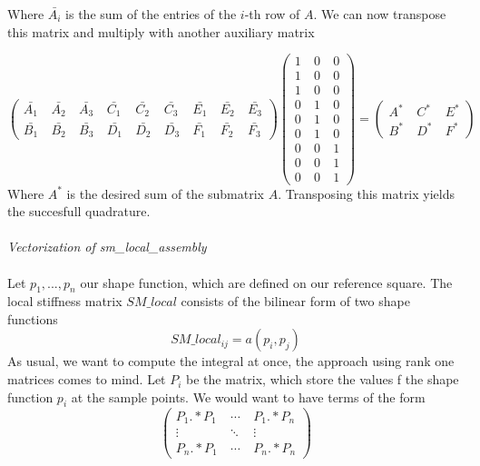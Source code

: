 Where $\bar{A_i}$ is the sum of the entries of the $i$-th row of $A$. We can now transpose this matrix and multiply with another auxiliary matrix

\[\begin{pmatrix} \bar{A_1} &\ \bar{A_2} &\ \bar{A_3} &\ \bar{C_1} &\ \bar{C_2} &\ \bar{C_3} &\ \bar{E_1} &\ \bar{E_2} &\ \bar{E_3} \\
\bar{B_1} &\ \bar{B_2} &\ \bar{B_3} &\ \bar{D_1} &\ \bar{D_2} &\ \bar{D_3} &\ \bar{F_1} &\ \bar{F_2} &\ \bar{F_3} \end{pmatrix}
\begin{pmatrix} 1 &\ 0 &\ 0 \\
				1 &\ 0 &\ 0 \\
                1 &\ 0 &\ 0 \\
                0 &\ 1 &\ 0 \\
                0 &\ 1 &\ 0 \\
                0 &\ 1 &\ 0 \\
                0 &\ 0 &\ 1 \\
                0 &\ 0 &\ 1 \\
                0 &\ 0 &\ 1 \end{pmatrix} = \begin{pmatrix} A^* &\ C^* &\ E^* \\ B^* &\ D^* &\ F^* \end{pmatrix} \]
Where $A^*$ is the desired sum of the submatrix $A$. Transposing this matrix yields the succesfull quadrature.\\
\\
\textit{Vectorization of sm\_local\_assembly}\\ \\
Let $p_1,...,p_n$ our shape function, which are defined on our reference square. The local stiffness matrix $SM\_local$ consists of the bilinear form of two shape functions
\[SM\_local_{i j}=a(p_i,p_j)\]
As usual, we want to compute the integral at once, the approach using rank one matrices comes to mind. Let $P_i$ be the matrix, which store the values f the shape function $p_i$ at the sample points. We would want to have terms of the form
\begin{equation} \begin{pmatrix} P_1.*P_1 &\ \cdots &\ P_1.*P_n \\
				   \vdots  &\ \ddots &\ \vdots \\
				   P_n.*P_1 &\ \cdots &\ P_n.*P_n \end{pmatrix} \end{equation}
